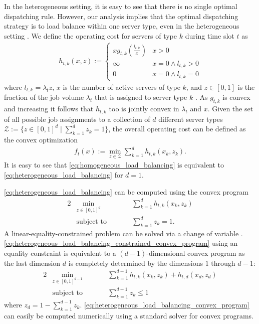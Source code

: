 In the heterogeneous setting, it is easy to see that there is no single optimal dispatching rule. However, our analysis implies that the optimal dispatching strategy is to load balance within one server type, even in the heterogeneous setting \cite{Albers2021_2}. We define the operating cost for servers of type $k$ during time slot $t$ as \begin{align}\label{eq:heterogeneous_load_balancing_unit}
    h_{t,k}(x,z) := \begin{cases}
        x g_{t,k}\left(\frac{l_{t,k}}{x}\right) & x > 0 \\
        \infty                                  & x = 0 \land l_{t,k} > 0 \\
        0                                       & x = 0 \land l_{t,k} = 0
    \end{cases}
\end{align} where $l_{t,k} = \lambda_t z$, $x$ is the number of active servers of type $k$, and $z \in [0,1]$ is the fraction of the job volume $\lambda_t$ that is assigned to server type $k$ \cite{Albers2021_2}. As $g_{t,k}$ is convex and increasing it follows that $h_{t,k}$ too is jointly convex in $\lambda_t$ and $x$. Given the set of all possible job assignments to a collection of $d$ different server types $\mathcal{Z} := \{z \in [0,1]^d \mid \sum_{k=1}^d z_k = 1\}$, the overall operating cost can be defined as the convex optimization \begin{align}\label{eq:heterogeneous_load_balancing}
    f_t(x) := \min_{z \in \mathcal{Z}} \sum_{k=1}^d h_{t,k}(x_k,z_k).
\end{align} It is easy to see that \autoref{eq:homogeneous_load_balancing} is equivalent to \autoref{eq:heterogeneous_load_balancing} for $d = 1$.

\autoref{eq:heterogeneous_load_balancing} can be computed using the convex program \begin{alignat}{2}\label{eq:heterogeneous_load_balancing_constrained_convex_program}
    &\min_{z \in [0,1]^d} &\qquad&\sum_{k=1}^d h_{t,k}(x_k,z_k) \\
    &\textrm{subject to}  &      &\sum_{k=1}^d z_k = 1.
\end{alignat} A linear-equality-constrained problem can be solved via a change of variable \cite{Singer2016}. \autoref{eq:heterogeneous_load_balancing_constrained_convex_program} using an equality constraint is equivalent to a $(d-1)$-dimensional convex program as the last dimension $d$ is completely determined by the dimensions $1$ through $d-1$: \begin{alignat}{2}\label{eq:heterogeneous_load_balancing_convex_program}
    &\min_{z \in [0,1]^{d-1}} &\qquad&\sum_{k=1}^{d-1} h_{t,k}(x_k,z_k) + h_{t,d}(x_d,z_d) \\
    &\textrm{subject to}  &      &\sum_{k=1}^{d-1} z_k \leq 1 \nonumber
\end{alignat} where $z_d = 1 - \sum_{k=1}^{d-1} z_k$. \autoref{eq:heterogeneous_load_balancing_convex_program} can easily be computed numerically using a standard solver for convex programs.

